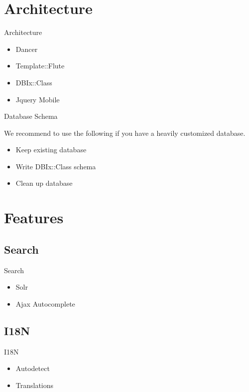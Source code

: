 \section{Architecture}
\begin{frame}{Architecture}
\begin{itemize}
\item Dancer
\item Template::Flute
\item DBIx::Class
\item Jquery Mobile
\end{itemize}
\end{frame}

\begin{frame}{Database Schema}

We recommend to use the following if you have a heavily customized
database.

\begin{itemize}
\item Keep existing database
\item Write DBIx::Class schema
\item Clean up database
\end{itemize}
\end{frame}

\section{Features}


\subsection{Search}
\begin{frame}{Search}
\begin{itemize}
\item Solr
\item Ajax Autocomplete
\end{itemize}
\end{frame}

\subsection{I18N}
\begin{frame}{I18N}
\begin{itemize}
\item Autodetect
\item Translations
\end{itemize}
\end{frame}

